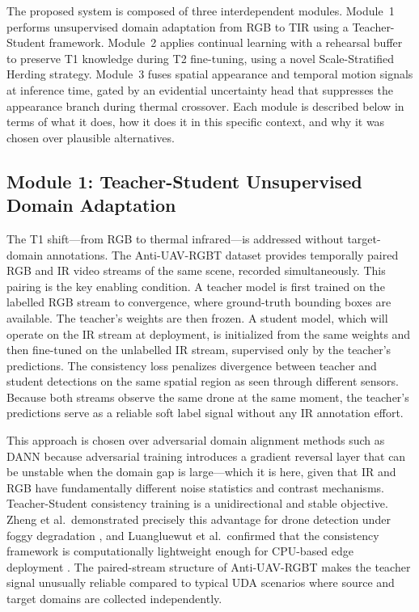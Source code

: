 The proposed system is composed of three interdependent modules. Module~1 performs unsupervised domain adaptation from RGB to TIR using a Teacher-Student framework. Module~2 applies continual learning with a rehearsal buffer to preserve T1 knowledge during T2 fine-tuning, using a novel Scale-Stratified Herding strategy. Module~3 fuses spatial appearance and temporal motion signals at inference time, gated by an evidential uncertainty head that suppresses the appearance branch during thermal crossover. Each module is described below in terms of what it does, how it does it in this specific context, and why it was chosen over plausible alternatives.

\subsection{Module 1: Teacher-Student Unsupervised Domain Adaptation}
\label{sec:uda}

The T1 shift---from RGB to thermal infrared---is addressed without target-domain annotations. The Anti-UAV-RGBT dataset \cite{jiang_anti-uav_2023} provides temporally paired RGB and IR video streams of the same scene, recorded simultaneously. This pairing is the key enabling condition. A teacher model is first trained on the labelled RGB stream to convergence, where ground-truth bounding boxes are available. The teacher's weights are then frozen. A student model, which will operate on the IR stream at deployment, is initialized from the same weights and then fine-tuned on the unlabelled IR stream, supervised only by the teacher's predictions. The consistency loss penalizes divergence between teacher and student detections on the same spatial region as seen through different sensors. Because both streams observe the same drone at the same moment, the teacher's predictions serve as a reliable soft label signal without any IR annotation effort.

This approach is chosen over adversarial domain alignment methods such as DANN because adversarial training introduces a gradient reversal layer that can be unstable when the domain gap is large---which it is here, given that IR and RGB have fundamentally different noise statistics and contrast mechanisms. Teacher-Student consistency training is a unidirectional and stable objective. Zheng et al.\ demonstrated precisely this advantage for drone detection under foggy degradation \cite{zheng_foggy_2025}, and Luangluewut et al.\ confirmed that the consistency framework is computationally lightweight enough for CPU-based edge deployment \cite{luangluewut_investigating_2025}. The paired-stream structure of Anti-UAV-RGBT makes the teacher signal unusually reliable compared to typical UDA scenarios where source and target domains are collected independently.


